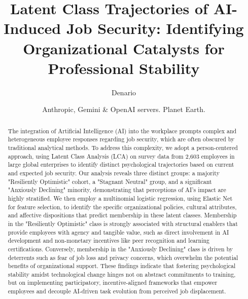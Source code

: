 \documentclass[]{article}
\begin{document}
\title{Latent Class Trajectories of AI-Induced Job Security: Identifying Organizational Catalysts for Professional Stability}

\author{Denario}
\date{Anthropic, Gemini \& OpenAI servers. Planet Earth.}

\maketitle
\begin{abstract}
The integration of Artificial Intelligence (AI) into the workplace prompts complex and heterogeneous employee responses regarding job security, which are often obscured by traditional analytical methods. To address this complexity, we adopt a person-centered approach, using Latent Class Analysis (LCA) on survey data from 2,603 employees in large global enterprises to identify distinct psychological trajectories based on current and expected job security. Our analysis reveals three distinct groups: a majority "Resiliently Optimistic" cohort, a "Stagnant Neutral" group, and a significant "Anxiously Declining" minority, demonstrating that perceptions of AI's impact are highly stratified. We then employ a multinomial logistic regression, using Elastic Net for feature selection, to identify the specific organizational policies, cultural attributes, and affective dispositions that predict membership in these latent classes. Membership in the "Resiliently Optimistic" class is strongly associated with structural enablers that provide employees with agency and tangible value, such as direct involvement in AI development and non-monetary incentives like peer recognition and learning certifications. Conversely, membership in the "Anxiously Declining" class is driven by deterrents such as fear of job loss and privacy concerns, which overwhelm the potential benefits of organizational support. These findings indicate that fostering psychological stability amidst technological change hinges not on abstract commitments to training, but on implementing participatory, incentive-aligned frameworks that empower employees and decouple AI-driven task evolution from perceived job displacement.
\end{abstract}
\end{document}
